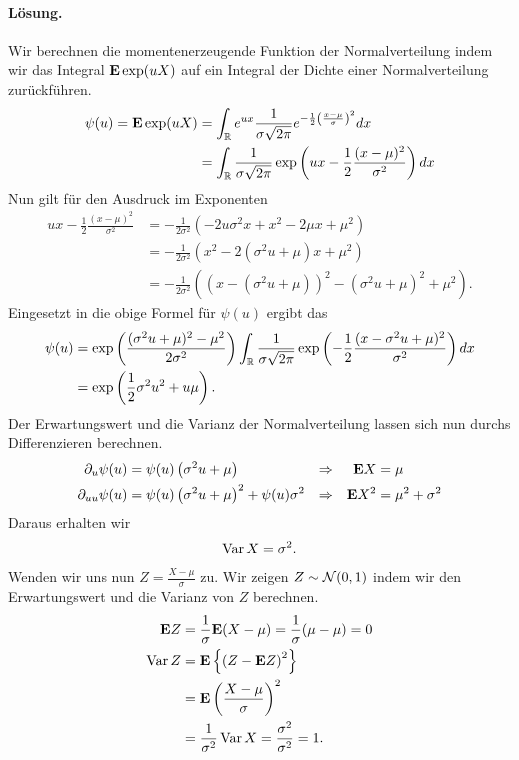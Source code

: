 \paragraph*{Lösung.} Wir berechnen die momentenerzeugende Funktion der
Normalverteilung indem wir das Integral $\mathbf{E} \exp (u X)$ auf ein Integral der
Dichte einer Normalverteilung zurückführen. 
\begin{align*}
    \psi(u) = \mathbf{E} \exp (u X)
    &= \int_{\mathbb R}^{} e^{ux } \frac{1}{\sigma \sqrt{2\pi}} 
    e^{ -\frac{1}{2}\left( \frac{x-\mu}{\sigma} \right)^2} dx \\
    &= \int_{\mathbb R}^{} \frac{1}{\sigma \sqrt{2\pi}} 
    \exp \left( ux - \frac{1}{2} \frac{(x-\mu)^2}{\sigma^2} \right) dx
\end{align*}
Nun gilt für den Ausdruck im Exponenten
\begin{align*}
    ux - \frac{1}{2} \frac{(x-\mu)^2}{\sigma^2} &= 
    -\frac{1}{2\sigma^2} \left( -2 u\sigma^2 x + x^2 - 2\mu x + \mu^2 \right) \\
    &= -\frac{1}{2\sigma^2} \left( x^2 - 2( \sigma^2 u +\mu  )x + \mu^2  \right)  \\
    &= -\frac{1}{2\sigma^2} \left( \left( x - (\sigma^2 u + \mu) \right)^2 
    - (\sigma^2 u + \mu)^2 + \mu^2  \right).
\end{align*}
Eingesetzt in die obige Formel für $\psi(u)$ ergibt das 
\begin{align*}
    \psi(u) &=  \exp \left( \frac{ (\sigma^2 u + \mu)^2 - \mu^2 }{2 \sigma^2} \right)
    \int_{\mathbb R}^{} \frac{1}{\sigma \sqrt{2\pi}} 
    \exp \left( - \frac{1}{2} \frac{(x- \sigma^2 u + \mu)^2}{\sigma^2} \right) dx \\
    &= \exp \left( \frac{1}{2} \sigma^2 u^2 + u \mu \right).
\end{align*}
Der Erwartungswert und die Varianz der Normalverteilung lassen sich nun durchs
Differenzieren berechnen. 
\begin{align*}
    \partial_u \psi(u) &= \psi(u) \left( \sigma^2 u + \mu \right) &\Rightarrow && \mathbf{E} X &= \mu \\
    \partial_{uu} \psi(u) &= \psi(u) \left( \sigma^2 u + \mu \right)^2 + \psi(u) \sigma^2
    & \Rightarrow && \mathbf{E} X^2 &= \mu^2 + \sigma^2
\end{align*}
Daraus erhalten wir 
\begin{align*}
    \operatorname{Var} X = \sigma^2.
\end{align*}
Wenden wir uns nun $Z = \frac{X - \mu}{\sigma}$ zu. Wir zeigen $Z \sim \mathcal N(0,1)$ 
indem wir den Erwartungswert und die Varianz von $Z$ berechnen. 
\begin{align*}
    \mathbf{E} Z &= \frac{1}{\sigma} \mathbf{E} (X- \mu) = \frac{1}{\sigma} ( \mu - \mu) = 0 \\
    \operatorname{Var} Z &= \mathbf{E} \left\{ \left( Z - \mathbf{E} Z \right)^2 \right\} \\ 
    &= \mathbf{E} \left( \frac{X - \mu}{\sigma} \right)^2 \\
    &= \frac{1}{\sigma^2} \operatorname{Var} X = \frac{\sigma^2}{\sigma^2} = 1.
\end{align*}

